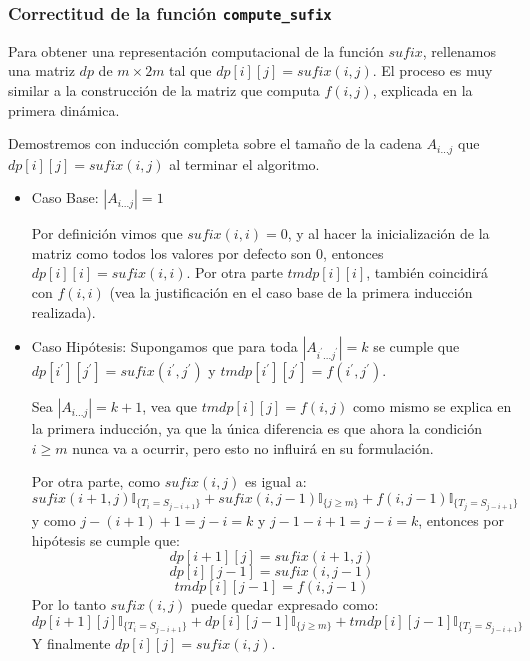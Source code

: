 \documentclass[a4paper]{article}
\begin{document}
    

    \subsubsection*{Correctitud de la funci\'on \texttt{compute\_sufix}}

    Para obtener una representaci\'on computacional de la funci\'on $sufix$,
    rellenamos una matriz $dp$ de $m \times 2m$ tal que $dp[i][j] = sufix(i,j)$. El proceso es muy similar a la construcción de la matriz que computa $f(i,j)$, explicada en la primera dinámica.
    
    Demostremos con inducción completa sobre el tamaño de la cadena $A_{i...j}$ que $dp[i][j]=sufix(i,j)$ al terminar el algoritmo.
    
    \begin{itemize}
    	\item Caso Base: $|A_{i...j}| = 1$
    	
    	Por definición vimos que $sufix(i,i) = 0$, y al hacer la inicialización de la matriz como todos los valores por defecto son $0$, entonces $dp[i][i] = sufix(i,i)$.
    	Por otra parte $tmdp[i][i]$, también coincidirá con $f(i,i)$ (vea la justificación en el caso base de la primera inducción realizada).
    	
    	\item Caso Hipótesis:
    	Supongamos que para toda $|A_{i^\prime...j^\prime}| = k$ se cumple que $dp[i^\prime][j^\prime] = sufix(i^\prime, j^\prime)$ y $tmdp[i^\prime][j^\prime] = f(i^\prime, j^\prime)$.
    	
    	Sea $|A_{i...j}| = k + 1$, vea que $tmdp[i][j] = f(i,j)$ como mismo se explica en la primera inducción, ya que la única diferencia es que ahora la condición $i \ge m$ nunca va a ocurrir, pero esto no influirá en su formulación.
    	
    	Por otra parte, como $sufix(i,j)$ es igual a:
    	$$ sufix(i+1,j)\mathbb{I}_{ \{ T_i = S_{j-i+1} \}} + 
    	sufix(i, j-1) \mathbb{I}_{ \{ j \ge m \}} + 
    	f(i, j-1) \mathbb{I}_{ \{ T_j = S_{j-i+1}\}} $$
    	y como $j-(i+1)+1 = j-i = k$ y $j-1 - i + 1 = j-i=k$, entonces por hipótesis se cumple que:
    	$$ dp[i+1][j] = sufix(i+1,j) $$
    	$$ dp[i][j-1] = sufix(i,j-1) $$
    	$$ tmdp[i][j-1] = f(i,j-1) $$
    	Por lo tanto $sufix(i,j)$ puede quedar expresado como:
    	$$ dp[i+1][j]\mathbb{I}_{ \{ T_i = S_{j-i+1} \}} + 
    	dp[i][j-1] \mathbb{I}_{ \{ j \ge m \}} + 
    	tmdp[i][j-1] \mathbb{I}_{ \{ T_j = S_{j-i+1}\}} $$
    	Y finalmente $dp[i][j] = sufix(i,j)$.    	
    \end{itemize}
	
\end{document}

